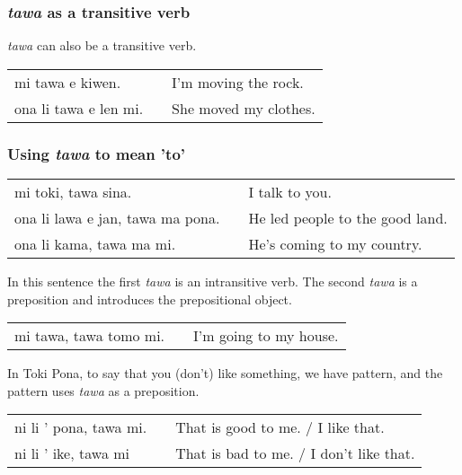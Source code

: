 \subsubsection*{\textit{tawa} as a transitive verb}
%
\textit{tawa} can also be a transitive verb.

\begin{supertabular}{p{5,5cm}|ll}
mi tawa e kiwen. && I'm moving the rock. \\
ona li tawa e len mi. && She moved my clothes. \\
\end{supertabular} 

%
\subsubsection*{Using \textit{tawa} to mean 'to'}
%

\begin{supertabular}{p{5,5cm}|ll}
mi toki, tawa sina. && I talk to you. \\
ona li lawa e jan, tawa ma pona. && He led people to the good land. \\
ona li kama, tawa ma mi. && He's coming to my country. \\
\end{supertabular} 

In this sentence the first \textit{tawa} is an intransitive verb.
The second \textit{tawa} is a preposition and introduces the prepositional object. 

\begin{supertabular}{p{5,5cm}|ll}
mi tawa, tawa tomo mi. && I'm going to my house. \\
\end{supertabular} 

In Toki Pona, to say that you (don't) like something, we have pattern, and the pattern uses \textit{tawa} as a preposition.

\begin{supertabular}{p{5,5cm}|ll}
ni li ' pona, tawa mi. && That is good to me. / I like that. \\
ni li ' ike, tawa mi && That is bad to me. / I don't like that. \\
\end{supertabular} 


